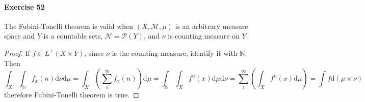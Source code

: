 \paragraph{Exercise 52}
The Fubini-Tonelli theorem is valid when $(X,\mathcal{M},\mu)$ is an arbitrary measure space and $Y$ is a countable sets, $\mathcal{N}=\mathcal{P}(Y)$, and $\nu$ is counting measure on $Y$.
\begin{proof}
    If $f\in L^+(X\times Y)$, since $\nu$ is the counting measure, identify it with $\mathbb{N}$. Then
    $$
    \int_X\int_{\mathbb{N}}f_x(n)\mathrm{d}\nu\mathrm{d}\mu=\int_X\left(\sum^\infty_1f_x(n)\right)\mathrm{d}\mu=\int_{\mathbb{N}}\int_Xf^n(x)\mathrm{d}\mu\mathrm{d}\nu=\sum^\infty_1\left(\int_Xf^n(x)\mathrm{d}\mu\right)=\int f\mathrm{d}(\mu\times\nu)
    $$
    therefore Fubini-Tonelli theorem is true.
\end{proof}